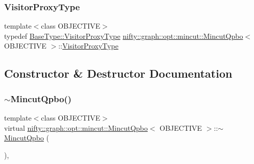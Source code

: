 \mbox{\label{classnifty_1_1graph_1_1opt_1_1mincut_1_1MincutQpbo_a66f72c74bd6db213eedc34a6736ac9a8}} 
\subsubsection{\texorpdfstring{Visitor\+Proxy\+Type}{VisitorProxyType}}
{\footnotesize\ttfamily template$<$class O\+B\+J\+E\+C\+T\+I\+VE$>$ \\
typedef \hyperlink{classnifty_1_1graph_1_1opt_1_1common_1_1SolverBase_ad209b469b3bc9fc0fc14e9fed4d09075}{Base\+Type\+::\+Visitor\+Proxy\+Type} \hyperlink{classnifty_1_1graph_1_1opt_1_1mincut_1_1MincutQpbo}{nifty\+::graph\+::opt\+::mincut\+::\+Mincut\+Qpbo}$<$ O\+B\+J\+E\+C\+T\+I\+VE $>$\+::\hyperlink{classnifty_1_1graph_1_1opt_1_1mincut_1_1MincutQpbo_a66f72c74bd6db213eedc34a6736ac9a8}{Visitor\+Proxy\+Type}}



\subsection{Constructor \& Destructor Documentation}
\mbox{\label{classnifty_1_1graph_1_1opt_1_1mincut_1_1MincutQpbo_a668a60d0a8e392aed0165b5ca9ab92a8}} 
\subsubsection{\texorpdfstring{$\sim$\+Mincut\+Qpbo()}{~MincutQpbo()}}
{\footnotesize\ttfamily template$<$class O\+B\+J\+E\+C\+T\+I\+VE$>$ \\
virtual \hyperlink{classnifty_1_1graph_1_1opt_1_1mincut_1_1MincutQpbo}{nifty\+::graph\+::opt\+::mincut\+::\+Mincut\+Qpbo}$<$ O\+B\+J\+E\+C\+T\+I\+VE $>$\+::$\sim$\hyperlink{classnifty_1_1graph_1_1opt_1_1mincut_1_1MincutQpbo}{Mincut\+Qpbo} (\begin{DoxyParamCaption}{ }\end{DoxyParamCaption})\hspace{0.3cm}{\ttfamily [inline]}, {\ttfamily [virtual]}}

